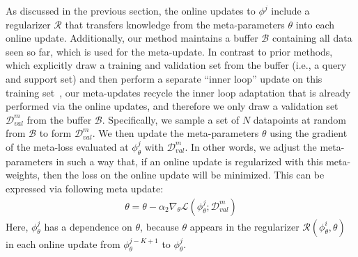 As discussed in the previous section, the online updates to $\phi^j$ include a regularizer $\mathcal{R}$ that transfers knowledge from the meta-parameters $\theta$ into each online update. Additionally, our method maintains a buffer $\mathcal{B}$ containing all data seen so far, which is used for the meta-update. In contrast to prior methods, which explicitly draw a training and validation set from the buffer (i.e., a query and support set) and then perform a separate ``inner loop'' update on this training set~\citep{finn19a}, our meta-updates recycle the inner loop adaptation that is already performed via the online updates, and therefore we only draw a validation set $\mathcal{D}_{val}^m$ from the buffer $\mathcal{B}$. Specifically, we sample a set of $N$ datapoints at random from $\mathcal{B}$ to form $\mathcal{D}_{val}^m$. We then update the meta-parameters $\theta$ using the gradient of the meta-loss evaluated at $\phi^j_{\theta}$  with $\mathcal{D}_{val}^m$. In other words, we adjust the meta-parameters in such a way that, if an online update is regularized with this meta-weights, then the loss on the online update will be minimized. This can be expressed via following meta update:
\begin{align*}
    \theta = \theta - \alpha_2 \nabla_{\theta} \mathcal{L}(\phi^j_{\theta}; \mathcal{D}_{val}^m) 
\end{align*}
Here, $\phi^j_\theta$ has a dependence on $\theta$, because $\theta$ appears in the regularizer $\mathcal{R}(\phi^i_{\theta}, \theta)$ in each online update from $\phi^{j-K+1}_\theta$ to $\phi^j_\theta$.


